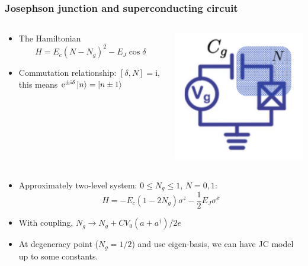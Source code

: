 \documentclass[xcolor=dvipsnames,hyperref={CJKbookmarks=true}]{beamer}
\newcommand\mi{\mathrm{i}}
\newcommand\e{\mathrm{e}}
\begin{document}
\begin{frame}[t]\frametitle{Josephson junction and superconducting circuit}
\begin{columns}
	\begin{column}{0.75\linewidth}
	\begin{itemize}
		\item The Hamiltonian
		$$
			H = E_c (N-N_g)^2 - E_J\cos\delta
		$$
		\item Commutation relationship: $[\delta, N] = \mi$, this means 
		$\e^{\pm\mi\delta}\ket{n} = \ket{n\pm 1}$
	\end{itemize}
	\end{column}%
	\begin{column}{0.25\linewidth}
	\includegraphics[width=\linewidth]{copper_pair_box.pdf}
	\end{column}
\end{columns}
\begin{itemize}
	\item Approximately two-level system: $0\le N_g \le 1$, $N = 0, 1$: 
	$$
	H = -E_c(1-2N_g) \sigma^z - \frac 12 E_J\sigma^x
	$$
	\item With coupling, $N_g \longrightarrow N_g + CV_0 (a + a^\dag)/2e$
	\item At degeneracy point ($N_g = 1/2$) and use eigen-basis, we can have JC model up to some constants. 
\end{itemize}
\end{frame}
\end{document}
